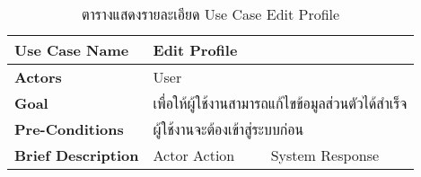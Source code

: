 \documentclass[12pt,oneside,openright,a4paper]{cpe-thai-project}
\begin{document}
\begin{table}[!h]
\caption{ตารางแสดงรายละเอียด Use Case Edit Profile}\label{tbl:table3.13}
\begin{tabular}{|l|ll|}
\hline
\textbf{Use Case Name}     & \multicolumn{2}{l|}{Edit Profile}                                                                                                                                                                                                                                                                                                                                                                                                                                                                                                     \\ \hline
\textbf{Actors}            & \multicolumn{2}{l|}{User}                                                                                                                                                                                                                                                                                                                                                                                                                                                                                                             \\ \hline
\textbf{Goal}              & \multicolumn{2}{l|}{เพื่อให้ผู้ใช้งานสามารถแก้ไขข้อมูลส่วนตัวได้สำเร็จ}                                                                                                                                                                                                                                                                                                                                                                                                                                                               \\ \hline
\textbf{Pre-Conditions}    & \multicolumn{2}{l|}{ผู้ใช้งานจะต้องเข้าสู่ระบบก่อน}                                                                                                                                                                                                                                                                                                                                                                                                                                                                                   \\ \hline
\textbf{Brief Description} & \multicolumn{1}{l|}{Actor Action}                                                                                                                                                                                                          & System Response                                                                                                                                                                                                                                                                          \\ \hline

\end{tabular}
\end{table}
\end{document}
